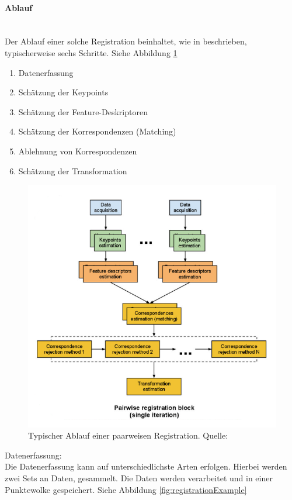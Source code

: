 \paragraph{Ablauf} \mbox{}\\
Der Ablauf einer solche Registration beinhaltet, wie in \cite{pcl2023} beschrieben, typischerweise sechs Schritte. 
Siehe Abbildung \ref{fig:registrationAblauf}
\begin{enumerate}[leftmargin=*]
    \item Datenerfassung
    \item Schätzung der Keypoints
    \item Schätzung der Feature-Deskriptoren
    \item Schätzung der Korrespondenzen (Matching)
    \item Ablehnung von Korrespondenzen
    \item Schätzung der Transformation
\end{enumerate}

\begin{figure}[H]
    \centering
    \includegraphics[width=12cm]{graphics/registration_ablauf.png}
    \caption{Typischer Ablauf einer paarweisen Registration. Quelle: \cite{pcl2023}}
    \label{fig:registrationAblauf}
\end{figure}

Datenerfassung: \\
Die Datenerfassung kann auf unterschiedlichste Arten erfolgen.
Hierbei werden zwei Sets an Daten, gesammelt.
Die Daten werden verarbeitet und in einer Punktewolke gespeichert. 
Siehe Abbildung \ref{fig:registrationExample}

